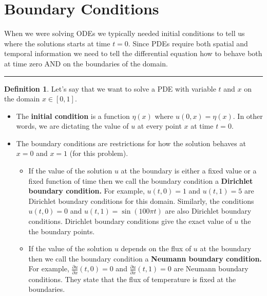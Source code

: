 \documentclass[
]{book}
\providecommand{\tightlist}{%
  \setlength{\itemsep}{0pt}\setlength{\parskip}{0pt}}
\theoremstyle{definition}
\newtheorem{definition}{Definition}[chapter]
\theoremstyle{definition}
\theoremstyle{definition}
\theoremstyle{remark}
\begin{document}
\hypertarget{boundary-conditions}{%
\section{Boundary Conditions}\label{boundary-conditions}}

When we were solving ODEs we typically needed initial conditions to tell us where the solutions starts at time \(t=0\). Since PDEs require both spatial and temporal information we need to tell the differential equation how to behave both at time zero AND on the boundaries of the domain.

\begin{center}\rule{0.5\linewidth}{0.5pt}\end{center}

\begin{definition}
\protect\hypertarget{def:unnamed-chunk-540}{}{\label{def:unnamed-chunk-540} }Let's say that we want to solve a PDE with variable \(t\) and \(x\) on the domain \(x \in [0,1]\).

\begin{itemize}
\tightlist
\item
  The \textbf{initial condition} is a function \(\eta(x)\) where \(u(0,x) = \eta(x)\). In other words, we are dictating the value of \(u\) at every point \(x\) at time \(t=0\).
\item
  The boundary conditions are restrictions for how the solution behaves at \(x=0\) and \(x=1\) (for this problem).

  \begin{itemize}
  \tightlist
  \item
    If the value of the solution \(u\) at the boundary is either a fixed value or a fixed function of time then we call the boundary condition a \textbf{Dirichlet boundary condition.} For example, \(u(t,0) = 1\) and \(u(t,1) = 5\) are Dirichlet boundary conditions for this domain. Similarly, the conditions \(u(t,0) = 0\) and \(u(t,1) = \sin(100\pi t)\) are also Dirichlet boundary conditions. Dirichlet boundary conditions give the exact value of \(u\) the the boundary points.
  \item
    If the value of the solution \(u\) depends on the flux of \(u\) at the boundary then we call the boundary condition a \textbf{Neumann boundary condition.} For example, \(\frac{\partial u}{\partial x}(t,0) = 0\) and \(\frac{\partial u}{\partial x}(t,1) = 0\) are Neumann boundary conditions. They state that the flux of temperature is fixed at the boundaries.
  \end{itemize}
\end{itemize}
\end{definition}
\end{document}

